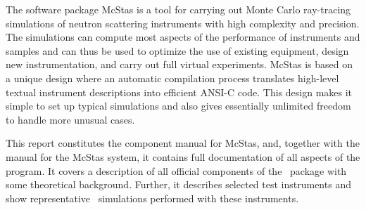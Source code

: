 The software package McStas is a tool for carrying out Monte Carlo
ray-tracing simulations of neutron scattering instruments with high
complexity and precision. The simulations can compute most aspects of the
performance of instruments and samples 
and can thus be used to optimize the use of existing equipment, 
design new instrumentation, and carry out full virtual experiments. 
McStas is based on a unique design where an automatic compilation process
translates high-level textual instrument descriptions into efficient
ANSI-C code. This design makes it simple to set up typical simulations
and also gives essentially unlimited freedom to handle more unusual
cases.

This report constitutes the component manual for McStas, and,
together with the manual for the McStas system, it
contains full documentation of all aspects of the program. It covers
a description of all official components of the \MCS\ package with
some theoretical background. Further, it describes selected test
instruments and show representative \MCS\ simulations performed with these
instruments.

